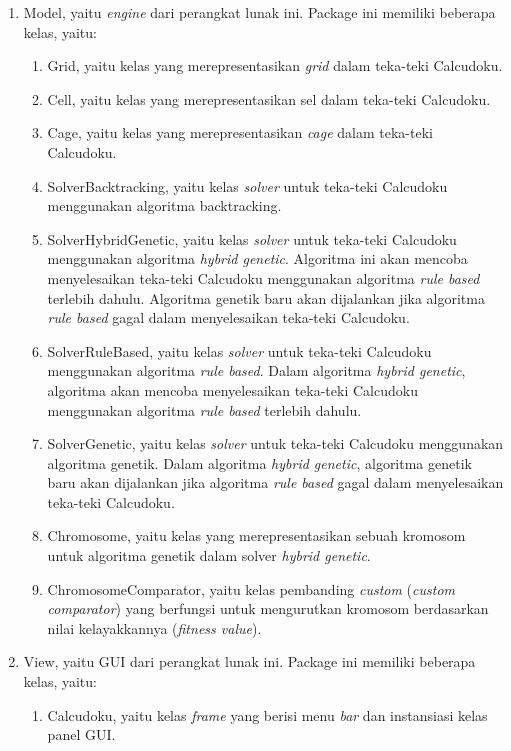 \begin{enumerate}
\item Model, yaitu \textit{engine} dari perangkat lunak ini. Package ini memiliki beberapa kelas, yaitu:
	\begin{enumerate}
	\item Grid, yaitu kelas yang merepresentasikan \textit{grid} dalam teka-teki Calcudoku.
	\item Cell, yaitu kelas yang merepresentasikan sel dalam teka-teki Calcudoku.
	\item Cage, yaitu kelas yang merepresentasikan \textit{cage} dalam teka-teki Calcudoku.
	\item SolverBacktracking, yaitu kelas \textit{solver} untuk teka-teki Calcudoku menggunakan algoritma backtracking.
	\item SolverHybridGenetic, yaitu kelas \textit{solver} untuk teka-teki Calcudoku menggunakan algoritma \textit{hybrid genetic}. Algoritma ini akan mencoba menyelesaikan teka-teki Calcudoku menggunakan algoritma \textit{rule based} terlebih dahulu. Algoritma genetik baru akan dijalankan jika algoritma \textit{rule based} gagal dalam menyelesaikan teka-teki Calcudoku.
	\item SolverRuleBased, yaitu kelas \textit{solver} untuk teka-teki Calcudoku menggunakan algoritma \textit{rule based}. Dalam algoritma \textit{hybrid genetic}, algoritma akan mencoba menyelesaikan teka-teki Calcudoku menggunakan algoritma \textit{rule based} terlebih dahulu.
	\item SolverGenetic, yaitu kelas \textit{solver} untuk teka-teki Calcudoku menggunakan algoritma genetik. Dalam algoritma \textit{hybrid genetic}, algoritma genetik baru akan dijalankan jika algoritma \textit{rule based} gagal dalam menyelesaikan teka-teki Calcudoku.
	\item Chromosome, yaitu kelas yang merepresentasikan sebuah kromosom untuk algoritma genetik dalam solver \textit{hybrid genetic}.
	\item ChromosomeComparator, yaitu kelas pembanding \textit{custom} (\textit{custom comparator}) yang berfungsi untuk mengurutkan kromosom berdasarkan nilai kelayakkannya (\textit{fitness value}).	
	\end{enumerate}
\item View, yaitu GUI dari perangkat lunak ini. Package ini memiliki beberapa kelas, yaitu:
	\begin{enumerate}
	\item Calcudoku, yaitu kelas \textit{frame} yang berisi menu \textit{bar} dan instansiasi kelas panel GUI.

\end{enumerate}
\end{enumerate}
